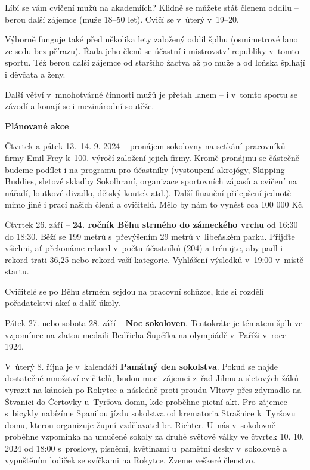 \documentclass[11pt]{article}
\begin{document}
Líbí se vám cvičení mužů na akademiích? Klidně se můžete stát členem oddílu – berou další zájemce (muže 18–50 let). Cvičí se v~úterý v~19–20. 

Výborně funguje také před několika lety založený oddíl šplhu (osmimetrové lano ze sedu bez přírazu). Řada jeho členů se účastní i mistrovství republiky v~tomto sportu. Též berou další zájemce od staršího žactva až po muže a od loňska šplhají i děvčata a ženy. 

Další větví v~mnohotvárné činnosti mužů je přetah lanem – i v~tomto sportu se závodí a konají se i mezinárodní soutěže. 

\vspace*{12pt}
\begin{center}
  \noindent\textbf{Plánované akce}
\end{center}
\vspace*{6pt}
Čtvrtek a pátek 13.–14. 9. 2024 – pronájem sokolovny na setkání pracovníků firmy Emil Frey k~100. výročí založení jejich firmy. Kromě pronájmu se částečně budeme podílet i na programu pro účastníky (vystoupení akrojógy, Skipping Buddies, sletové skladby Sokolhraní, organizace sportovních zápasů a cvičení na nářadí, loutkové divadlo, dětský koutek atd.). Další finanční přilepšení jednotě mimo jiné i prací našich členů a cvičitelů. Mělo by nám to vynést cca 100 000 Kč.   

Čtvrtek 26. září – \textbf{24. ročník Běhu strmého do zámeckého vrchu} od 16:30 do 18:30. Běží se 199 metrů s~převýšením 29 metrů v~libeňském parku. Přijďte všichni, ať překonáme rekord v~počtu účastníků (204) a trénujte, aby padl i rekord trati 36,25 nebo rekord vaší kategorie. Vyhlášení výsledků v~19:00 v~místě startu. 

Cvičitelé se po Běhu strmém sejdou na pracovní schůzce, kde si rozdělí pořadatelství akcí a další úkoly.

Pátek 27. nebo sobota 28. září – \textbf{Noc sokoloven}. Tentokráte je tématem šplh ve vzpomínce na zlatou medaili Bedřicha Šupčíka na olympiádě v~Paříži v~roce 1924.

V~úterý 8. října je v~kalendáři \textbf{Památný den sokolstva}. Pokud se najde dostatečné množství cvičitelů, budou moci zájemci z~řad Jilmu a sletových žáků vyrazit na kánoích po Rokytce a následně proti proudu Vltavy přes zdymadlo na Štvanici do Čertovky u~Tyršova domu, kde proběhne pietní akt. Pro zájemce s~bicykly nabízíme Spanilou jízdu sokolstva od krematoria Strašnice k~Tyršovu domu, kterou organizuje župní vzdělavatel br. Richter. U~nás v~sokolovně proběhne vzpomínka na umučené sokoly za druhé světové války ve čtvrtek 10. 10. 2024 od 18:00 s~proslovy, písněmi, květinami u~pamětní desky v~sokolovně a vypuštěním lodiček se svíčkami na Rokytce. Zveme veškeré členstvo.
\end{document}
